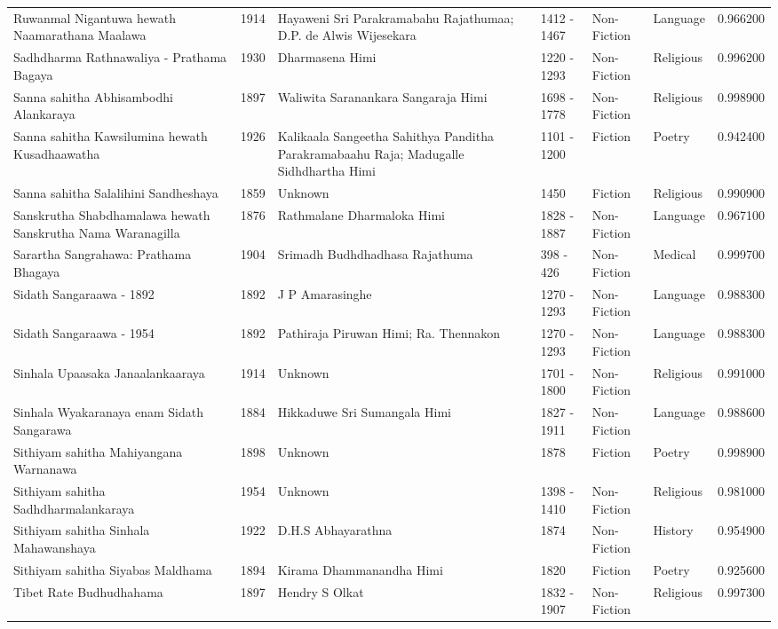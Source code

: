 \begin{tabular}{lrllllr}
Ruwanmal Nigantuwa hewath Naamarathana Maalawa & 1914 & Hayaweni Sri Parakramabahu Rajathumaa; D.P. de Alwis Wijesekara & 1412 - 1467 & Non-Fiction & Language & 0.966200 \\
Sadhdharma Rathnawaliya - Prathama Bagaya & 1930 & Dharmasena Himi & 1220 - 1293 & Non-Fiction & Religious & 0.996200 \\
Sanna sahitha Abhisambodhi Alankaraya & 1897 & Waliwita Saranankara Sangaraja Himi & 1698 - 1778 & Non-Fiction & Religious & 0.998900 \\
Sanna sahitha Kawsilumina hewath Kusadhaawatha & 1926 & Kalikaala Sangeetha Sahithya Panditha Parakramabaahu Raja; Madugalle Sidhdhartha Himi & 1101 - 1200 & Fiction & Poetry & 0.942400 \\
Sanna sahitha Salalihini Sandheshaya & 1859 & Unknown & 1450 & Fiction & Religious & 0.990900 \\
Sanskrutha Shabdhamalawa hewath Sanskrutha Nama Waranagilla & 1876 & Rathmalane Dharmaloka Himi & 1828 - 1887 & Non-Fiction & Language & 0.967100 \\
Sarartha Sangrahawa: Prathama Bhagaya & 1904 & Srimadh Budhdhadhasa Rajathuma & 398 - 426 & Non-Fiction & Medical & 0.999700 \\
Sidath Sangaraawa - 1892 & 1892 & J P Amarasinghe & 1270 - 1293 & Non-Fiction & Language & 0.988300 \\
Sidath Sangaraawa - 1954 & 1892 & Pathiraja Piruwan Himi; Ra. Thennakon & 1270 - 1293 & Non-Fiction & Language & 0.988300 \\
Sinhala Upaasaka Janaalankaaraya & 1914 & Unknown & 1701 - 1800 & Non-Fiction & Religious & 0.991000 \\
Sinhala Wyakaranaya enam Sidath Sangarawa & 1884 & Hikkaduwe Sri Sumangala Himi & 1827 - 1911 & Non-Fiction & Language & 0.988600 \\
Sithiyam sahitha Mahiyangana Warnanawa & 1898 & Unknown & 1878 & Fiction & Poetry & 0.998900 \\
Sithiyam sahitha Sadhdharmalankaraya & 1954 & Unknown & 1398 - 1410 & Non-Fiction & Religious & 0.981000 \\
Sithiyam sahitha Sinhala Mahawanshaya & 1922 & D.H.S Abhayarathna & 1874 & Non-Fiction & History & 0.954900 \\
Sithiyam sahitha Siyabas Maldhama & 1894 & Kirama Dhammanandha Himi & 1820 & Fiction & Poetry & 0.925600 \\
Tibet Rate Budhudhahama & 1897 & Hendry S Olkat & 1832 - 1907 & Non-Fiction & Religious & 0.997300 \\

\end{tabular}
